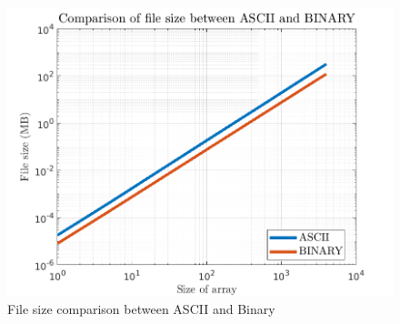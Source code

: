 \documentclass[12pt]{article}
\begin{document}
\begin{figure}[h]
    \centering
    \includegraphics[scale=0.8]{Comparison_of_file_size_between_ASCII_and_BINARY.png}
    \caption{File size comparison between ASCII and Binary}
    \label{fig:enter-label}
\end{figure}
\end{document}
